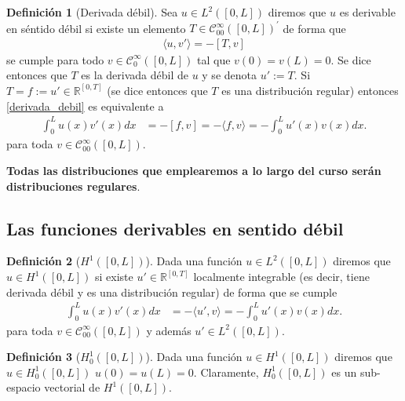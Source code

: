 \documentclass[10pt,handout]{beamer}
\theoremstyle{plain} %
\theoremstyle{plain} %
\theoremstyle{plain} %
\theoremstyle{plain} %
\theoremstyle{definition}
\newtheorem{defn}{Definici\'on}
\theoremstyle{example}
\theoremstyle{example}
\theoremstyle{remark}
\theoremstyle{remark}
\begin{document}
\begin{frame}
\begin{defn}[Derivada débil]
Sea $u \in L^2([0,L])$ diremos que $u$ es derivable en séntido débil 
si existe un elemento  $T \in \mathcal{C}_{00}^{\infty}([0,L])^{\prime}$ de forma  que
\begin{align}
\langle u , v' \rangle = -[T , v ]  \label{derivada_debil}
\end{align} 
se cumple para todo $v \in \mathcal{C}_0^{\infty}([0,L])$ tal que $v(0)=v(L)=0.$ Se dice entonces que $T$ es la derivada débil de $u$ y se denota $u':= T .$ Si $T= f := u'\in \mathbb{R}^{[0,T]}$ (se dice entonces que $T$ es una distribución regular) entonces \eqref{derivada_debil} es equivalente
a
\begin{align*}
\int_0^L u(x)v'(x)dx & = - [f,v] = - \langle f, v \rangle  = - \int_0^L u'(x)v(x)dx.
\end{align*}
para toda $v \in \mathcal{C}_{00}^{\infty}([0,L]).$
\end{defn}
\textbf{Todas las distribuciones que emplearemos a lo largo del curso serán distribuciones regulares}.
\end{frame}

\subsection{Las funciones derivables en sentido débil}

\begin{frame}
\begin{defn}[{$H^1([0,L])$}]
Dada una función $u \in L^2([0,L])$ diremos que $u \in H^1([0,L])$  
si existe $u' \in \mathbb{R}^{[0,T]}$ localmente integrable (es decir, tiene derivada débil y es una distribución regular) de forma que se cumple
\begin{align*}
\int_0^L u(x)v'(x)dx & = - \langle u', v \rangle = - \int_0^L u'(x)v(x)dx.
\end{align*}
para toda $v \in \mathcal{C}_{00}^{\infty}([0,L])$ y además $u' \in L^2([0,L]).$
\end{defn}
\begin{defn}[{$H_0^1([0,L])$}]
Dada una función $u \in H^1([0,L])$ diremos que $u \in H_0^1([0,L])$  
$u(0)=u(L)=0.$ Claramente, $H_0^1([0,L])$ es un sub-espacio vectorial de $H^1([0,L]).$
\end{defn}
\end{frame}
\end{document}

